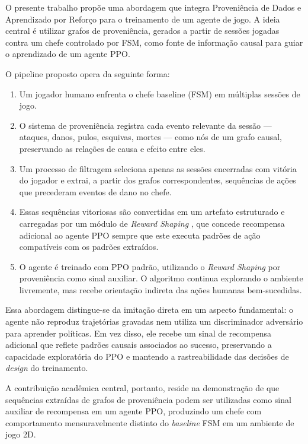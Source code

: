 O presente trabalho propõe uma abordagem que integra Proveniência de Dados e
Aprendizado por Reforço para o treinamento de um agente de jogo. A ideia
central é utilizar grafos de proveniência, gerados a partir de sessões jogadas
contra um chefe controlado por FSM, como fonte de informação causal para guiar
o aprendizado de um agente PPO.

O pipeline proposto opera da seguinte forma:

\begin{enumerate}
    \item Um jogador humano enfrenta o chefe baseline (FSM) em múltiplas
          sessões de jogo.
    \item O sistema de proveniência registra cada evento relevante da sessão
          --- ataques, danos, pulos, esquivas, mortes --- como nós de um
          grafo causal, preservando as relações de causa e efeito entre eles.
    \item Um processo de filtragem seleciona apenas as sessões encerradas
          com vitória do jogador e extrai, a partir dos grafos correspondentes,
          sequências de ações que precederam eventos de dano no chefe.
    \item Essas sequências vitoriosas são convertidas em um artefato
          estruturado e carregadas por um módulo de \textit{Reward Shaping}
          \cite{ng1999reward}, que concede recompensa adicional ao agente PPO
          sempre que este executa padrões de ação compatíveis com os padrões
          extraídos.
    \item O agente é treinado com PPO padrão, utilizando o
          \textit{Reward Shaping} por proveniência como sinal auxiliar. O
          algoritmo continua explorando o ambiente livremente, mas recebe
          orientação indireta das ações humanas bem-sucedidas.
\end{enumerate}

Essa abordagem distingue-se da imitação direta em um aspecto fundamental: o
agente não reproduz trajetórias gravadas nem utiliza um discriminador
adversário para aprender políticas. Em vez disso, ele recebe um sinal de
recompensa adicional que reflete padrões causais associados ao sucesso,
preservando a capacidade exploratória do PPO e mantendo a rastreabilidade das
decisões de \textit{design} do treinamento.

A contribuição acadêmica central, portanto, reside na demonstração de que
sequências extraídas de grafos de proveniência podem ser utilizadas como sinal
auxiliar de recompensa em um agente PPO, produzindo um chefe com comportamento
mensuravelmente distinto do \textit{baseline} FSM em um ambiente de jogo 2D.

